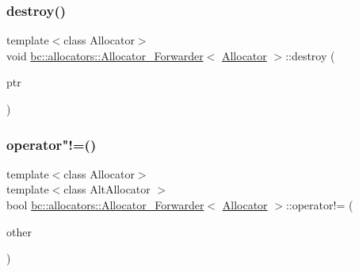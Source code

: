 \mbox{\label{structbc_1_1allocators_1_1Allocator__Forwarder_ac1850fadacf28cda7171fde065fbf9ca}} 
\subsubsection{\texorpdfstring{destroy()}{destroy()}}
{\footnotesize\ttfamily template$<$class Allocator$>$ \\
void \hyperlink{structbc_1_1allocators_1_1Allocator__Forwarder}{bc\+::allocators\+::\+Allocator\+\_\+\+Forwarder}$<$ \hyperlink{classbc_1_1allocators_1_1Allocator}{Allocator} $>$\+::destroy (\begin{DoxyParamCaption}\item[{\hyperlink{structbc_1_1allocators_1_1Allocator__Forwarder_ae9d48fbeb22a6686ad59128cf309d8bd}{pointer}}]{ptr }\end{DoxyParamCaption})\hspace{0.3cm}{\ttfamily [inline]}}

\mbox{\label{structbc_1_1allocators_1_1Allocator__Forwarder_a40b22dcdc0fdb388389bac905bf2aec7}} 
\subsubsection{\texorpdfstring{operator"!=()}{operator!=()}}
{\footnotesize\ttfamily template$<$class Allocator$>$ \\
template$<$class Alt\+Allocator $>$ \\
bool \hyperlink{structbc_1_1allocators_1_1Allocator__Forwarder}{bc\+::allocators\+::\+Allocator\+\_\+\+Forwarder}$<$ \hyperlink{classbc_1_1allocators_1_1Allocator}{Allocator} $>$\+::operator!= (\begin{DoxyParamCaption}\item[{const Alt\+Allocator \&}]{other }\end{DoxyParamCaption})\hspace{0.3cm}{\ttfamily [inline]}}

